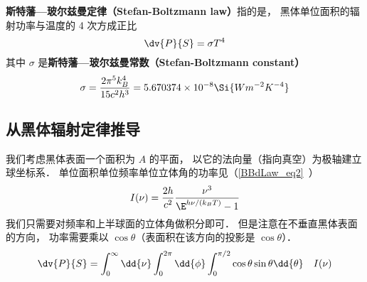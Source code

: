 
\textbf{斯特藩—玻尔兹曼定律（Stefan-Boltzmann law）}指的是， 黑体单位面积的辐射功率与温度的 4 次方成正比
\begin{equation}
\dv{P}{S} = \sigma T^4
\end{equation}
其中 $\sigma$ 是\textbf{斯特藩—玻尔兹曼常数（Stefan-Boltzmann constant）}
\begin{equation}
\sigma = \frac{2\pi^5k_B^4}{15c^2h^3} = 5.670374 \times 10^{-8} \Si{Wm^{-2}K^{-4}}
\end{equation}

\subsection{从黑体辐射定律推导}
我们考虑黑体表面一个面积为 $A$ 的平面， 以它的法向量（指向真空）为极轴建立球坐标系． 单位面积单位频率单位立体角的功率见（\autoref{BBdLaw_eq2}~）
\begin{equation}
I(\nu) = \frac{2h}{c^2} \frac{\nu^3}{\E^{h\nu/(k_B T)} - 1}
\end{equation}
我们只需要对频率和上半球面的立体角做积分即可． 但是注意在不垂直黑体表面的方向， 功率需要乘以 $\cos\theta$（表面积在该方向的投影是 $\cos\theta$）．
\begin{equation}
\dv{P}{S} = \int_0^\infty \dd{\nu} \int_0^{2\pi} \dd{\phi} \int_0^{\pi/2}\cos\theta\sin\theta\dd{\theta} \quad I(\nu)
\end{equation}
